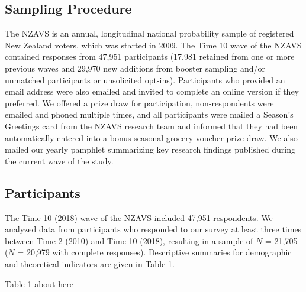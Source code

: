 \documentclass[
  english,
  man,floatsintext]{apa6}
\begin{document}
\hypertarget{sampling-procedure}{%
\subsection{Sampling Procedure}\label{sampling-procedure}}

The NZAVS is an annual, longitudinal national probability sample of registered New Zealand voters, which was started in 2009. The Time 10 wave of the NZAVS contained responses from 47,951 participants (17,981 retained from one or more previous waves and 29,970 new additions from booster sampling and/or unmatched participants or unsolicited opt-ins). Participants who provided an email address were also emailed and invited to complete an online version if they preferred. We offered a prize draw for participation, non-respondents were emailed and phoned multiple times, and all participants were mailed a Season's Greetings card from the NZAVS research team and informed that they had been automatically entered into a bonus seasonal grocery voucher prize draw. We also mailed our yearly pamphlet summarizing key research findings published during the current wave of the study.

\hypertarget{participants}{%
\subsection{Participants}\label{participants}}

The Time 10 (2018) wave of the NZAVS included 47,951 respondents. We analyzed data from participants who responded to our survey at least three times between Time 2 (2010) and Time 10 (2018), resulting in a sample of \(N\) = 21,705 (\(N\) = 20,979 with complete responses). Descriptive summaries for demographic and theoretical indicators are given in Table 1.

Table 1 about here
\end{document}
